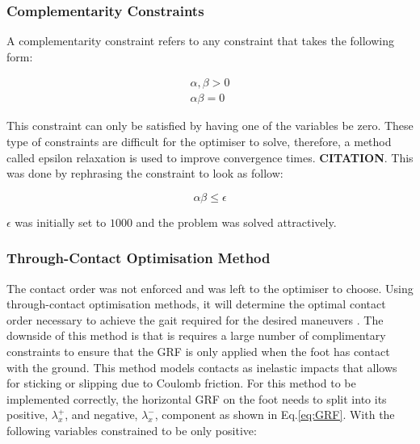         \subsubsection{Complementarity Constraints}
        A complementarity constraint refers to any constraint that takes the following form:
        
        \begin{equation}
            \begin{split}
                \alpha, \beta > 0 \\
                \alpha \beta = 0 
            \end{split}
        \end{equation}
        
        This constraint can only be satisfied by having one of the variables be zero. These type of constraints are difficult for the optimiser to solve, therefore, a method called epsilon relaxation is used to improve convergence times. \textbf{CITATION}. This was done by rephrasing the constraint to look as follow:
        
        \begin{equation}
            \alpha \beta \leq \epsilon
        \end{equation}
        
        $\epsilon$ was initially set to $1000$ and the problem was solved attractively.
        
        \subsubsection{Through-Contact Optimisation Method} \label{through-contact}
        The contact order was not enforced and was left to the optimiser to choose. Using through-contact optimisation methods, it will determine the optimal contact order necessary to achieve the gait required for the desired maneuvers \cite{Posa-2014}. The downside of this method is that is requires a large number of complimentary constraints to ensure that the GRF is only applied when the foot has contact with the ground. This method models contacts as inelastic impacts that allows for sticking or slipping due to Coulomb friction. For this method to be implemented correctly, the horizontal GRF on the foot needs to split into its positive, $\lambda_x^+$, and negative, $\lambda_x^-$, component as shown in Eq.\ref{eq:GRF}. With the following variables constrained to be only positive:
        
